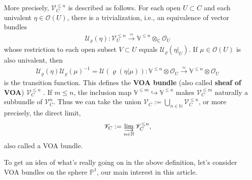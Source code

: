\documentclass[11pt,b5paper,notitlepage]{article}
\theoremstyle{definition}
\theoremstyle{plain}
\newcommand{\mc}{\mathcal}
\newcommand{\scr}{\mathscr}
\newcommand{\Vbb}{\mathbb V}
\newcommand{\Cbb}{\mathbb C}
\newcommand{\Nbb}{\mathbb N}
\newcommand{\Pbb}{\mathbb P}
\numberwithin{equation}{section}
\begin{document}
More precisely, $\scr V^{\leq n}_C$ is described as follows. For each open $U\subset C$ and each univalent $\eta\in\scr O(U)$, there is a trivialization, i.e., an equivalence of vector bundles \index{U@$\mc U_\varrho(\eta)$}
\begin{align*}
\mc U_\varrho(\eta):\scr V_U^{\leq n}\xrightarrow{\simeq} \Vbb^{\leq n}\otimes_\Cbb\scr O_U
\end{align*}
whose restriction to each open subset $V\subset U$ equals $\mc U_\varrho(\eta|_U)$. If $\mu\in\scr O(U)$ is also univalent, then
\begin{align}
\mc U_\varrho(\eta)\mc U_\varrho(\mu)^{-1}=\mc U(\varrho(\eta|\mu)): \Vbb^{\leq n}\otimes\scr O_U\xrightarrow{\simeq}\Vbb^{\leq n}\otimes\scr O_U
\end{align}
is the transition function. This defines the \textbf{VOA bundle} (also called \textbf{sheaf of VOA}) $\scr V_C^{\leq n}$ \index{VC@$\scr V^{\leq n}_C,\scr V_C$}. If $m\leq n$, the inclusion map $\Vbb^{\leq m}\hookrightarrow\Vbb^{\leq n}$ makes $\scr V_C^{\leq m}$ naturally a subbundle of $\scr V_C^n$. Thus we can take the union $\scr V_C:=\bigcup_{n\in\Nbb}\scr V^{\leq n}_C$, or more precisely, the direct limit,
\begin{align*}
\scr V_C:=\varinjlim_{n\in\Nbb}\scr V^{\leq n}_C,
\end{align*}
also called a VOA bundle.


To get an idea of what's really going on in the above definition, let's consider VOA bundles on the sphere $\Pbb^1$, our main interest in this article.
\end{document}
